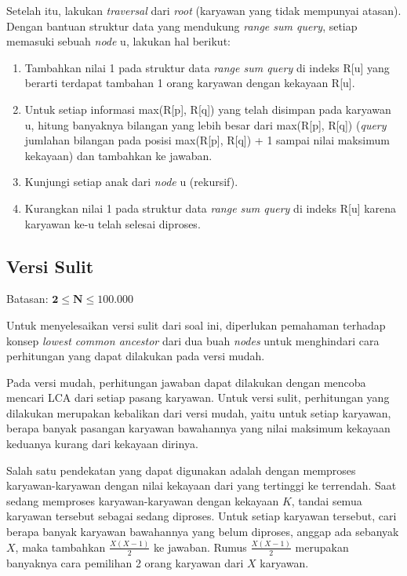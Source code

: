 \documentclass[../main_editorial.tex]{subfiles} %
\begin{document}
Setelah itu, lakukan \textit{traversal} dari \textit{root} (karyawan yang tidak mempunyai atasan). Dengan bantuan struktur data yang mendukung \textit{range sum query}, setiap memasuki sebuah \textit{node} u, lakukan hal berikut:
\begin{enumerate}
	\item Tambahkan nilai 1 pada struktur data \textit{range sum query} di indeks R[u] yang berarti terdapat tambahan 1 orang karyawan dengan kekayaan R[u].
	\item Untuk setiap informasi max(R[p], R[q]) yang telah disimpan pada karyawan u, hitung banyaknya bilangan yang lebih besar dari max(R[p], R[q]) (\textit{query} jumlahan bilangan pada posisi max(R[p], R[q]) + 1 sampai nilai maksimum kekayaan) dan tambahkan ke jawaban.
	\item Kunjungi setiap anak dari \textit{node} u (rekursif).
	\item Kurangkan nilai 1 pada struktur data \textit{range sum query} di indeks R[u] karena karyawan ke-u telah selesai diproses.
\end{enumerate}

\subsection*{Versi Sulit}

Batasan: $\mathbf{2 \le N \le 100.000}$

Untuk menyelesaikan versi sulit dari soal ini, diperlukan pemahaman terhadap konsep \textit{lowest common ancestor} dari dua buah \textit{nodes} untuk menghindari cara perhitungan yang dapat dilakukan pada versi mudah.

Pada versi mudah, perhitungan jawaban dapat dilakukan dengan mencoba mencari LCA dari setiap pasang karyawan. Untuk versi sulit, perhitungan yang dilakukan merupakan kebalikan dari versi mudah, yaitu untuk setiap karyawan, berapa banyak pasangan karyawan bawahannya yang nilai maksimum kekayaan keduanya kurang dari kekayaan dirinya.

Salah satu pendekatan yang dapat digunakan adalah dengan memproses karyawan-karyawan dengan nilai kekayaan dari yang tertinggi ke terrendah. Saat sedang memproses karyawan-karyawan dengan kekayaan $K$, tandai semua karyawan tersebut sebagai sedang diproses. Untuk setiap karyawan tersebut, cari berapa banyak karyawan bawahannya yang belum diproses, anggap ada sebanyak $X$, maka tambahkan $\frac{X (X - 1)}{2}$ ke jawaban. Rumus $\frac{X (X - 1)}{2}$ merupakan banyaknya cara pemilihan 2 orang karyawan dari $X$ karyawan.
\end{document}
